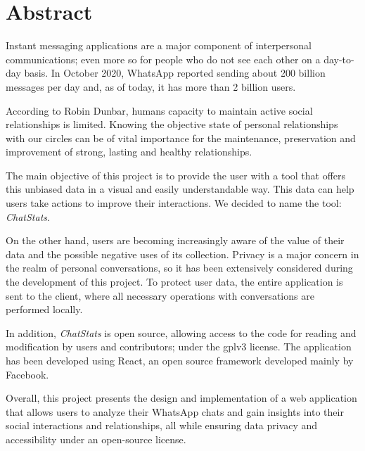 \cleardoublepage
{}
\chapter*{Abstract}

Instant messaging applications are a major component of interpersonal communications; even more so for people who do not see each other on a day-to-day basis. In October 2020, WhatsApp reported sending about 200 billion messages per day \cite{whatsAppsPerDay} and, as of today, it has more than 2 billion users.\cite{whatsAppsUsers}

According to Robin Dunbar, humans capacity to maintain active social relationships is limited.\cite{dunbarNumber} Knowing the objective state of personal relationships with our circles can be of vital importance for the maintenance, preservation and improvement of strong, lasting and healthy relationships.

The main objective of this project is to provide the user with a tool that offers this unbiased data in a visual and easily understandable way. This data can help users take actions to improve their interactions. We decided to name the tool: \textit{ChatStats}.

On the other hand, users are becoming increasingly aware of the value of their data and the possible negative uses of its collection. Privacy is a major concern in the realm of personal conversations, so it has been extensively considered during the development of this project. To protect user data, the entire application is sent to the client, where all necessary operations with conversations are performed locally.

In addition, \textit{ChatStats} is open source, allowing access to the code for reading and modification by users and contributors; under the \acrfull{gplv3} license. The application has been developed using React, an open source framework developed mainly by Facebook.

Overall, this project presents the design and implementation of a web application that allows users to analyze their WhatsApp chats and gain insights into their social interactions and relationships, all while ensuring data privacy and accessibility under an open-source license.

